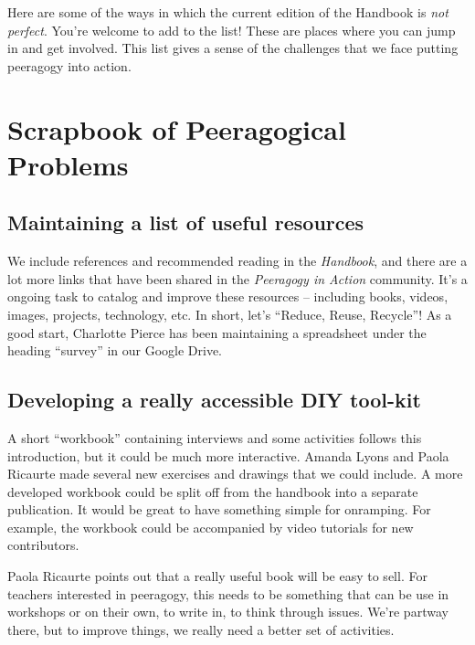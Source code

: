 Here are some of the ways in which the current edition of the Handbook
is \emph{not perfect}. You're welcome to add to the list! These are
places where you can jump in and get involved. This list gives a sense
of the challenges that we face putting peeragogy into action.

\hypertarget{scrapbook-of-peeragogical-problems}{%
\section{Scrapbook of Peeragogical
Problems}\label{scrapbook-of-peeragogical-problems}}

\hypertarget{maintaining-a-list-of-useful-resources}{%
\subsection{Maintaining a list of useful
resources}\label{maintaining-a-list-of-useful-resources}}

We include references and recommended reading in the \emph{Handbook},
and there are a lot more links that have been shared in the
\emph{Peeragogy in Action} community. It's a ongoing task to catalog and
improve these resources -- including books, videos, images, projects,
technology, etc. In short, let's ``Reduce, Reuse, Recycle''! As a good
start, Charlotte Pierce has been maintaining a spreadsheet under the
heading ``survey'' in our Google Drive.

\hypertarget{developing-a-really-accessible-diy-tool-kit}{%
\subsection{Developing a really accessible DIY
tool-kit}\label{developing-a-really-accessible-diy-tool-kit}}

A short ``workbook'' containing interviews and some activities follows
this introduction, but it could be much more interactive. Amanda Lyons
and Paola Ricaurte made several new exercises and drawings that we could
include. A more developed workbook could be split off from the handbook
into a separate publication. It would be great to have something simple
for onramping. For example, the workbook could be accompanied by video
tutorials for new contributors.

Paola Ricaurte points out that a really useful book will be easy to
sell. For teachers interested in peeragogy, this needs to be something
that can be use in workshops or on their own, to write in, to think
through issues. We're partway there, but to improve things, we really
need a better set of activities.

